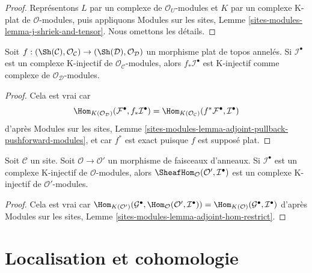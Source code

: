\begin{proof}
Représentons $L$ par un complexe de $\mathcal{O}_U$-modules et $K$ par un
complexe K-plat de $\mathcal{O}$-modules, puis appliquons Modules sur les
sites, Lemme \ref{sites-modules-lemma-j-shriek-and-tensor}. Nous omettons
les détails.
\end{proof}

\begin{lemma}
\label{lemma-K-injective-flat}
Soit $f : (\Sh(\mathcal{C}), \mathcal{O}_\mathcal{C}) \to
(\Sh(\mathcal{D}), \mathcal{O}_\mathcal{D})$ un morphisme plat de topos
annelés. Si $\mathcal{I}^\bullet$ est un complexe K-injectif de
$\mathcal{O}_\mathcal{C}$-modules, alors $f_*\mathcal{I}^\bullet$ est
K-injectif comme complexe de $\mathcal{O}_\mathcal{D}$-modules.
\end{lemma}

\begin{proof}
Cela est vrai car
$$
\Hom_{K(\mathcal{O}_\mathcal{D})}(\mathcal{F}^\bullet, f_*\mathcal{I}^\bullet)
=
\Hom_{K(\mathcal{O}_\mathcal{C})}(f^*\mathcal{F}^\bullet, \mathcal{I}^\bullet)
$$
d'après Modules sur les sites, Lemme
\ref{sites-modules-lemma-adjoint-pullback-pushforward-modules}, et car
$f^*$ est exact puisque $f$ est supposé plat.
\end{proof}

\begin{lemma}
\label{lemma-hom-K-injective}
Soit $\mathcal{C}$ un site. Soit $\mathcal{O} \to \mathcal{O}'$ un
morphisme de faisceaux d'anneaux. Si $\mathcal{I}^\bullet$ est un complexe
K-injectif de $\mathcal{O}$-modules, alors
$\SheafHom_\mathcal{O}(\mathcal{O}', \mathcal{I}^\bullet)$
est un complexe K-injectif de $\mathcal{O}'$-modules.
\end{lemma}

\begin{proof}
Cela est vrai car
$\Hom_{K(\mathcal{O}')}(\mathcal{G}^\bullet,
\Hom_\mathcal{O}(\mathcal{O}', \mathcal{I}^\bullet)) =
\Hom_{K(\mathcal{O})}(\mathcal{G}^\bullet, \mathcal{I}^\bullet)$
d'après Modules sur les sites, Lemme
\ref{sites-modules-lemma-adjoint-hom-restrict}.
\end{proof}






\section{Localisation et cohomologie}
\label{section-localization}

